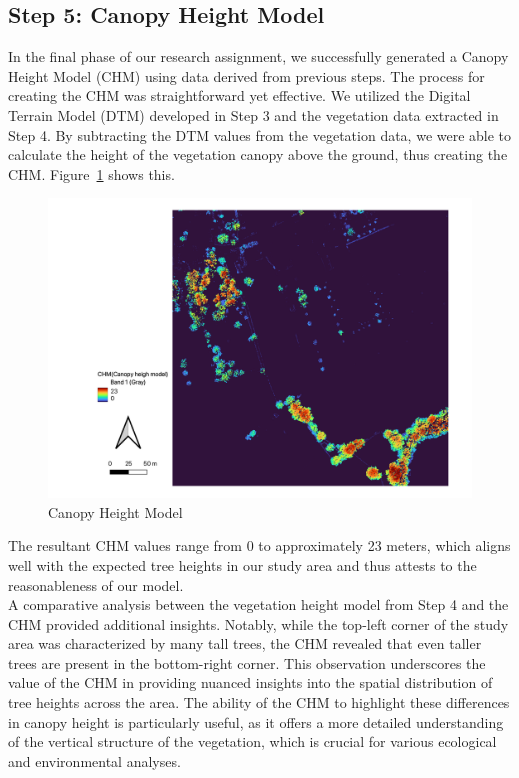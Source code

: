 \documentclass{article}
\begin{document}
\subsection{Step 5: Canopy Height Model}
In the final phase of our research assignment, we successfully generated a Canopy Height Model (CHM) using data derived from previous steps. The process for creating the CHM was straightforward yet effective. We utilized the Digital Terrain Model (DTM) developed in Step 3 and the vegetation data extracted in Step 4. By subtracting the DTM values from the vegetation data, we were able to calculate the height of the vegetation canopy above the ground, thus creating the CHM. Figure~\ref{step5} shows this.\\

\begin{figure}[H]
    \centering
    \includegraphics[width=0.7\linewidth]{Figures/step5.png}
    \caption{Canopy Height Model}
    \label{step5}
\end{figure}


\noindent The resultant CHM values range from 0 to approximately 23 meters, which aligns well with the expected tree heights in our study area and thus attests to the reasonableness of our model.\\

\noindent A comparative analysis between the vegetation height model from Step 4 and the CHM provided additional insights. Notably, while the top-left corner of the study area was characterized by many tall trees, the CHM revealed that even taller trees are present in the bottom-right corner. This observation underscores the value of the CHM in providing nuanced insights into the spatial distribution of tree heights across the area. The ability of the CHM to highlight these differences in canopy height is particularly useful, as it offers a more detailed understanding of the vertical structure of the vegetation, which is crucial for various ecological and environmental analyses.
\end{document}

